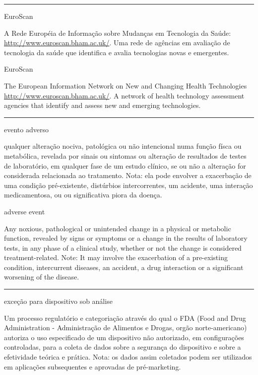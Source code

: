 \documentclass[
  openany]{book}
\begin{document}
\begin{center}\rule{0.5\linewidth}{0.5pt}\end{center}

EuroScan

A Rede Européia de Informação sobre Mudanças em Tecnologia da Saúde: \url{http://www.euroscan.bham.ac.uk/}. Uma rede de agências em avaliação de tecnologia da saúde que identifica e avalia tecnologias novas e emergentes.

EuroScan

The European Information Network on New and Changing Health Technologies \url{http://www.euroscan.bham.ac.uk/}. A network of health technology assessment agencies that identify and assess new and emerging technologies.

\begin{center}\rule{0.5\linewidth}{0.5pt}\end{center}

evento adverso

qualquer alteração nociva, patológica ou não intencional numa função físca ou metabólica, revelada por sinais ou sintomas ou alteração de resultados de testes de laboratório, em qualquer fase de um estudo clínico, se ou não a alteração for considerada relacionada ao tratamento. Nota: ela pode envolver a exacerbação de uma condição pré-existente, distúrbios intercorrentes, um acidente, uma interação medicamentosa, ou ou significativa piora da doença.

adverse event

Any noxious, pathological or unintended change in a physical or metabolic function, revealed by signs or symptoms or a change in the results of laboratory tests, in any phase of a clinical study, whether or not the change is considered treatment-related. Note: It may involve the exacerbation of a pre-existing condition, intercurrent diseases, an accident, a drug interaction or a significant worsening of the disease.

\begin{center}\rule{0.5\linewidth}{0.5pt}\end{center}

exceção para dispositivo sob análise

Um processo regulatório e categoriação através do qual o FDA (Food and Drug Administration - Administração de Alimentos e Drogas, orgão norte-americano) autoriza o uso especificado de um dispositivo não autorizado, em configurações controladas, para a coleta de dados sobre a segurança do dispositivo e sobre a efetividade teórica e prática. Nota: os dados assim coletados podem ser utilizados em aplicações subsequentes e aprovadas de pré-marketing.
\end{document}
